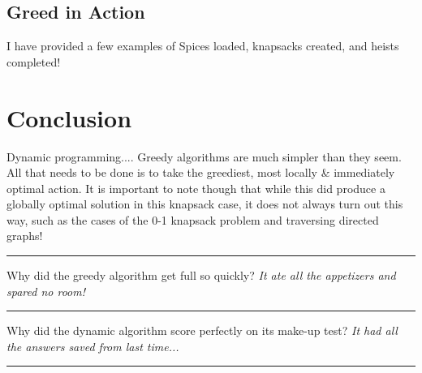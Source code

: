 \documentclass[letterpaper, 10pt]{article}
\begin{document}
\subsection{Greed in Action}
I have provided a few examples of Spices loaded, knapsacks created, and heists completed!


\section{Conclusion}
Dynamic programming.... Greedy algorithms are much simpler than they seem. All that needs to be done is to take the greediest, most locally \& immediately optimal action. It is important to note though that while this did produce a globally optimal solution in this knapsack case, it does not always turn out this way, such as the cases of the 0-1 knapsack problem and traversing directed graphs!

\hrule
\vspace{.25cm}
Why did the greedy algorithm get full so quickly? \textit{It ate all the appetizers and spared no room!}
\vspace{.25cm}
\hrule
\vspace{.25cm}
Why did the dynamic algorithm score perfectly on its make-up test? \textit{It had all the answers saved from last time...}
\vspace{.25cm}
\hrule
\end{document}
